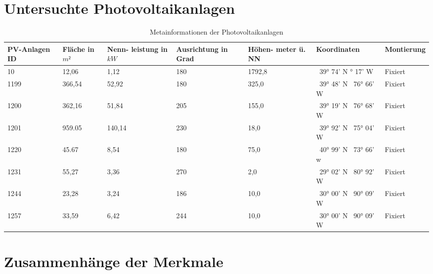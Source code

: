 \documentclass[12pt, a4paper]{article}
\begin{document}
\newpage

\section{Untersuchte Photovoltaikanlagen}

\begin{table}[h]
\begin{center}
\begin{tabular}{| p{1.5cm} | p{1.5cm} | p{1.5cm} | p{2.3cm}  | p{2cm} | p{2.2cm} | p{2cm} |}
\hline
PV-Anlagen ID & Fläche in $m²$ & Nenn- leistung in $kW$ & Ausrichtung in Grad & Höhen- meter ü. NN & Koordinaten & Montierung \\ \hline
  10 &  12,06 &   1,12 & 180 & 1792,8 & \ 39° 74' N \newline   105° 17' W & Fixiert \\ \hline
1199 & 366,54 &  52,92 & 180 &  325,0 & \ 39° 48' N \newline \  76° 66' W & Fixiert \\ \hline
1200 & 362,16 &  51,84 & 205 &  155,0 & \ 39° 19' N \newline \  76° 68' W & Fixiert \\ \hline
1201 & 959.05 & 140,14 & 230 &   18,0 & \ 39° 92' N \newline \  75° 04' W & Fixiert \\ \hline
1220 &  45.67 &   8,54 & 180 &   75,0 & \ 40° 99' N \newline \  73° 66' w & Fixiert \\ \hline
1231 &  55,27 &   3,36 & 270 &    2,0 & \ 29° 02' N \newline \  80° 92' W & Fixiert \\ \hline
1244 &  23,28 &   3,24 & 186 &   10,0 & \ 30° 00' N \newline \  90° 09' W & Fixiert \\ \hline
1257 &  33,59 &   6,42 & 244 &   10,0 & \ 30° 00' N \newline \  90° 09' W & Fixiert \\ \hline


\end{tabular}
\end{center}
\caption{Metainformationen der Photovoltaikanlagen}
\label{tab:solarsystem_metadata} 
\end{table}


\newpage

\section{Zusammenhänge der Merkmale}
\label{sec:features}
\end{document}
